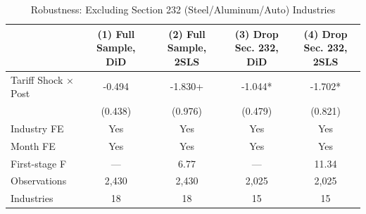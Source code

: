 \begin{table}[h]
\centering
\caption{Robustness: Excluding Section 232 (Steel/Aluminum/Auto) Industries}
\label{tab:robustness}
\begin{tabular}{lcccc}
\toprule
 & (1) Full Sample, DiD & (2) Full Sample, 2SLS & (3) Drop Sec. 232, DiD & (4) Drop Sec. 232, 2SLS \\
\midrule
Tariff Shock × Post & -0.494 & -1.830+ & -1.044* & -1.702* \\
 & (0.438) & (0.976) & (0.479) & (0.821) \\
Industry FE & Yes & Yes & Yes & Yes \\
Month FE & Yes & Yes & Yes & Yes \\
First-stage F & — & 6.77 & — & 11.34 \\
Observations & 2,430 & 2,430 & 2,025 & 2,025 \\
Industries & 18 & 18 & 15 & 15 \\
\bottomrule
\end{tabular}
\end{table}
